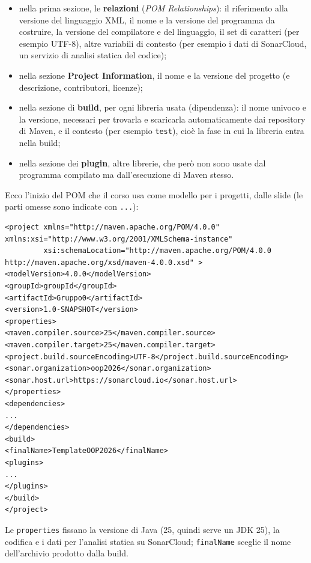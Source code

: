 \begin{itemize}
  \item nella prima sezione, le \textbf{relazioni} (\textit{POM Relationships}): il riferimento alla versione del
        linguaggio XML, il nome e la versione del programma da costruire, la versione del compilatore e del linguaggio,
        il set di caratteri (per esempio UTF-8), altre variabili di contesto (per esempio i dati di SonarCloud, un
        servizio di analisi statica del codice);
  \item nella sezione \textbf{Project Information}, il nome e la versione del progetto (e descrizione, contributori,
        licenze);
  \item nella sezione di \textbf{build}, per ogni libreria usata (dipendenza): il nome univoco e la versione, necessari
        per trovarla e scaricarla automaticamente dai repository di Maven, e il contesto (per esempio \texttt{test}),
        cioè la fase in cui la libreria entra nella build;
  \item nella sezione dei \textbf{plugin}, altre librerie, che però non sono usate dal programma compilato ma
        dall'esecuzione di Maven stesso.
\end{itemize}

Ecco l'inizio del POM che il corso usa come modello per i progetti, dalle slide (le parti omesse sono indicate con
\texttt{...}):

\begin{lstlisting}[style=xml, name=pom.xml]
<project xmlns="http://maven.apache.org/POM/4.0.0" xmlns:xsi="http://www.w3.org/2001/XMLSchema-instance"
         xsi:schemaLocation="http://maven.apache.org/POM/4.0.0 http://maven.apache.org/xsd/maven-4.0.0.xsd" >
<modelVersion>4.0.0</modelVersion>
<groupId>groupId</groupId>
<artifactId>Gruppo0</artifactId>
<version>1.0-SNAPSHOT</version>
<properties>
<maven.compiler.source>25</maven.compiler.source>
<maven.compiler.target>25</maven.compiler.target>
<project.build.sourceEncoding>UTF-8</project.build.sourceEncoding>
<sonar.organization>oop2026</sonar.organization>
<sonar.host.url>https://sonarcloud.io</sonar.host.url>
</properties>
<dependencies>
...
</dependencies>
<build>
<finalName>TemplateOOP2026</finalName>
<plugins>
...
</plugins>
</build>
</project>
\end{lstlisting}

Le \texttt{properties} fissano la versione di Java (25, quindi serve un JDK 25), la codifica e i dati per l'analisi
statica su SonarCloud; \texttt{finalName} sceglie il nome dell'archivio prodotto dalla build.

